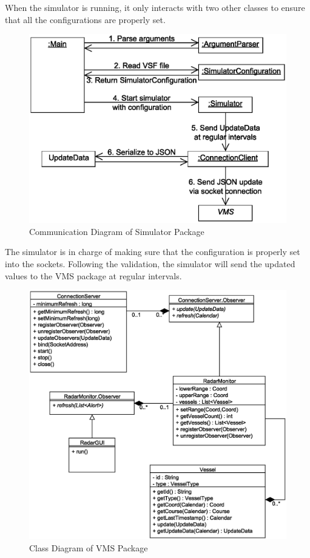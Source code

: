 \documentclass{article}
\begin{document}
When the simulator is running, it only interacts with two other classes to ensure that all the configurations are properly set.

\break

\begin{figure}[!htb]
\caption{Communication Diagram of Simulator Package}
\centering
\includegraphics[scale=0.5]{diagrams/simulator-communication-diagram.eps}
\end{figure}

The simulator is in charge of making sure that the configuration is properly set into the sockets. Following the validation, the simulator will send the updated values to the VMS package at regular intervals.

\begin{figure}[!htb]	
\caption{Class Diagram of VMS Package}
\centering
\includegraphics[scale=0.5]{diagrams/vms-class-diagram.eps}
\end{figure}
\end{document}
